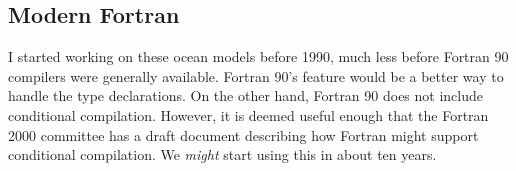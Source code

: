 \subsection{Modern Fortran}
I started working on these ocean models before 1990, much less before
Fortran 90 compilers were generally available.  Fortran 90's
 feature would be a better way to handle the 
type declarations.  On the other hand, Fortran 90 does not include
conditional compilation.  However, it is deemed useful enough that the
Fortran 2000 committee has a draft document describing how Fortran
might support conditional compilation.  We {\em might} start using this
in about ten years.
